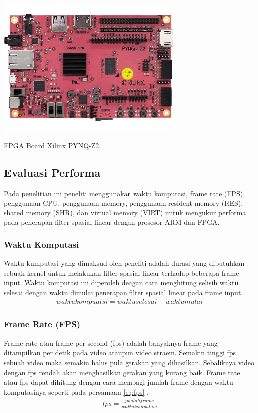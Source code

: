\begin{afigure}
    \includegraphics[width=9cm, center]{images/pynq-z2.jpeg}
    \caption{FPGA Board Xilinx PYNQ-Z2.}
    \label{fig:pynq-z2}
\end{afigure}


\subsection{Evaluasi Performa}
Pada penelitian ini peneliti menggunakan waktu komputasi, frame rate (FPS), penggunaan CPU, penggunaan memory, penggunaan resident memory (RES), shared memory (SHR), dan virtual memory (VIRT) untuk mengukur performa pada penerapan filter spasial linear dengan prosesor ARM dan FPGA.

\subsubsection{Waktu Komputasi}
Waktu kumputasi yang dimaksud oleh peneliti adalah durasi yang dibutuhkan sebuah kernel untuk melakukan filter spasial linear terhadap beberapa frame input. Waktu komputasi ini diperoleh dengan cara menghitung selisih waktu selesai dengan waktu dimulai penerapan filter spasial linear pada frame input.
\begin{equation}
    \label{eq:time}
    \begin{split}
waktu kompuatsi = waktu selesai - waktu mulai
    \end{split}
\end{equation}

\subsubsection{Frame Rate (FPS)}
Frame rate atau frame per second (fps) adalah banyaknya frame yang ditampilkan per detik pada video ataupun video straem. Semakin tinggi fps sebuah video maka semakin halus pula gerakan yang dihasilkan. Sebaliknya video dengan fps rendah akan menghasilkan gerakan yang kurang baik. Frame rate atau fps dapat dihitung dengan cara membagi jumlah frame dengan waktu komputasinya seperti pada persamaan \ref{eq:fps} .
\begin{equation}
    \label{eq:fps}
    \begin{split}
fps = \frac{jumlah frame}{waktu komputasi}
    \end{split}
\end{equation}

